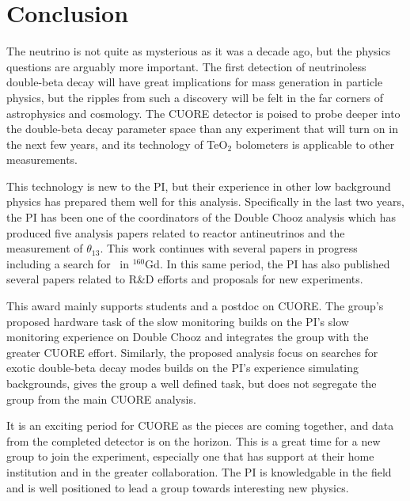 \section{Conclusion}
The neutrino is not quite as mysterious as it was a decade ago, but the physics questions are arguably more important. The first detection of neutrinoless double-beta decay will have great implications for mass generation in particle physics, but the ripples from such a discovery will be felt in the far corners of astrophysics and cosmology. The CUORE  detector is poised to probe deeper into the double-beta decay parameter space than any experiment that will turn on in the next few years, and its technology of TeO$_2$ bolometers is applicable to other measurements.

This technology is new to the PI, but their experience in other low background physics has prepared them well for this analysis. Specifically in the last two years, the PI has been one of the coordinators of the Double Chooz  analysis which has produced five analysis papers related to reactor antineutrinos and the measurement of $\theta_{13}$\cite{dcone, dctwo, takahama,Abe:2012gw,Abe:2012ar}. This work continues with several papers in progress including a search for \zeronu~in $^{160}$Gd. In this same period, the PI has also published several papers related to R\&D efforts and proposals for new experiments\cite{Alonso:2010fs,isodar,qdot,Lopez201222}.

This award mainly supports students and a postdoc on CUORE. The group's proposed hardware task of the slow monitoring builds on the PI's slow monitoring experience on Double Chooz and integrates the group with the greater CUORE effort. Similarly, the proposed analysis focus on searches for exotic double-beta decay modes builds on the PI's experience simulating backgrounds, gives the group a well defined task, but does not segregate the group from the main CUORE analysis. 

It is an exciting period for CUORE as the pieces are coming together, and data from the completed detector is on the horizon. This is a great time for a new group to join the experiment, especially one that has support at their home institution and in the greater collaboration. The PI is knowledgable in the field and is well positioned to lead a group towards interesting new physics. 
